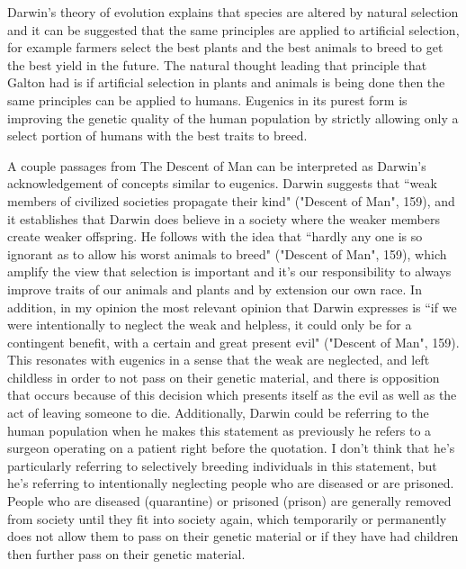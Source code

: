 \documentclass[11pt, oneside]{article}
\begin{document}
\par Darwin's theory of evolution explains that species are altered by natural selection and it can be suggested that the same principles are applied to artificial selection, for example farmers select the best plants and the best animals to breed to get the best yield in the future. The natural thought leading that principle that Galton had is if artificial selection in plants and animals is being done then the same principles can be applied to humans. Eugenics in its purest form is improving the genetic quality of the human population by strictly allowing only a select portion of humans with the best traits to breed. 

\par A couple passages from The Descent of Man can be interpreted as Darwin's acknowledgement of concepts similar to eugenics. Darwin suggests that ``weak members of civilized societies propagate their kind" ("Descent of Man", 159), and it establishes that Darwin does believe in a society where the weaker members create weaker offspring. He follows with the idea that ``hardly any one is so ignorant as to allow his worst animals to breed" ("Descent of Man", 159), which amplify the view that selection is important and it's our responsibility to always improve traits of our animals and plants and by extension our own race. In addition, in my opinion the most relevant opinion that Darwin expresses is  ``if we were intentionally to neglect the weak and helpless, it could only be for a contingent benefit, with a certain and great present evil" ("Descent of Man", 159). This resonates with eugenics in a sense that the weak are neglected, and left childless in order to not pass on their genetic material, and there is opposition that occurs because of this decision which presents itself as the evil as well as the act of leaving someone to die. Additionally, Darwin could be referring to the human population when he makes this statement as previously he refers to a surgeon operating on a patient right before the quotation. I don't think that he's particularly referring to selectively breeding individuals in this statement, but he's referring to intentionally neglecting people who are diseased or are prisoned. People who are diseased (quarantine) or prisoned (prison) are generally removed from society until they fit into society again, which temporarily or permanently does not allow them to pass on their genetic material or if they have had children then further pass on their genetic material. 
\end{document}
